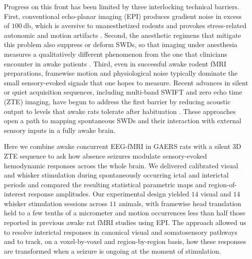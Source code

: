 \documentclass[11pt]{article}
\begin{document}
Progress on this front has been limited by three interlocking technical barriers. First, conventional echo-planar imaging (EPI) produces gradient noise in excess of $100~\si{\decibel}$, which is aversive to unanesthetized rodents and provokes stress-related autonomic and motion artifacts \citep{paasonen2018}. Second, the anesthetic regimens that mitigate this problem also suppress or deform SWDs, so that imaging under anesthesia measures a qualitatively different phenomenon from the one that clinicians encounter in awake patients \citep{mishra2011}. Third, even in successful awake rodent fMRI preparations, framewise motion and physiological noise typically dominate the small sensory-evoked signals that one hopes to measure. Recent advances in silent or quiet acquisition sequences, including multi-band SWIFT and zero echo time (ZTE) imaging, have begun to address the first barrier by reducing acoustic output to levels that awake rats tolerate after habituation \citep{paasonen2020,wiesinger2022,lehto2017,stenroos2018}. These approaches open a path to mapping spontaneous SWDs and their interaction with external sensory inputs in a fully awake brain.

Here we combine awake concurrent EEG-fMRI in GAERS rats with a silent 3D ZTE sequence to ask how absence seizures modulate sensory-evoked hemodynamic responses across the whole brain. We delivered calibrated visual and whisker stimulation during spontaneously occurring ictal and interictal periods and compared the resulting statistical parametric maps and region-of-interest response amplitudes. Our experimental design yielded $14$ visual and $14$ whisker stimulation sessions across $11$ animals, with framewise head translation held to a few tenths of a micrometer and motion occurrences less than half those reported in previous awake rat fMRI studies using EPI. The approach allowed us to resolve interictal responses in canonical visual and somatosensory pathways and to track, on a voxel-by-voxel and region-by-region basis, how these responses are transformed when a seizure is ongoing at the moment of stimulation.
\end{document}
